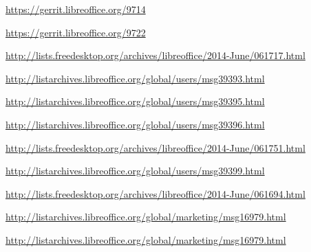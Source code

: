 \documentclass{article}
\begin{document}
\begin{thebibliography}{30}
\url{https://gerrit.libreoffice.org/9714}

\url{https://gerrit.libreoffice.org/9722}

\url{http://lists.freedesktop.org/archives/libreoffice/2014-June/061717.html}

\url{http://listarchives.libreoffice.org/global/users/msg39393.html}

\url{http://listarchives.libreoffice.org/global/users/msg39395.html}

\url{http://listarchives.libreoffice.org/global/users/msg39396.html}

\url{http://lists.freedesktop.org/archives/libreoffice/2014-June/061751.html}

\url{http://listarchives.libreoffice.org/global/users/msg39399.html}

\url{http://lists.freedesktop.org/archives/libreoffice/2014-June/061694.html}

\url{http://listarchives.libreoffice.org/global/marketing/msg16979.html}

\url{http://listarchives.libreoffice.org/global/marketing/msg16979.html}

\end{thebibliography}
\end{document}
